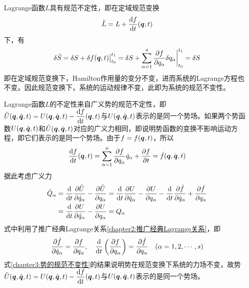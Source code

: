 Lagrange函数$L$具有规范不定性，即在{\heiti 定域规范变换}
\begin{equation}
	\tilde{L} = L + \frac{\mathrm{d} f}{\mathrm{d} t}(\boldsymbol{q},t)
\end{equation}
下，有
\begin{equation*}
	\delta \tilde{S} = \delta S + \delta f(\boldsymbol{q},t)\big|_{t_0}^{t_1} = \delta S + \sum_{\alpha=1}^s \frac{\partial f}{\partial q_\alpha} \delta q_\alpha \bigg|_{t_0}^{t_1} = \delta S
\end{equation*}
即在定域规范变换下，Hamilton作用量的变分不变，进而系统的Lagrange方程也不变。因此规范变换下，系统的运动规律不变，此即为系统的{\heiti 规范不变性}。

Lagrange函数$L$的不定性来自广义势的规范不定性，即$\tilde{U}(\boldsymbol{q},\dot{\boldsymbol{q}},t) = U(\boldsymbol{q},\dot{\boldsymbol{q}},t) - \dfrac{\mathrm{d} f}{\mathrm{d} t}(\boldsymbol{q},t)$与$U(\boldsymbol{q},\dot{\boldsymbol{q}},t)$表示的是同一个势场。如果两个势函数$U(\boldsymbol{q},\dot{\boldsymbol{q}},t)$和$\tilde{U}(\boldsymbol{q},\dot{\boldsymbol{q}},t)$对应的广义力相同，即说明势函数的变换不影响运动方程，即它们表示的是同一个势场。由于$f = f(\boldsymbol{q},t)$，所以
\begin{equation*}
	\dfrac{\mathrm{d} f}{\mathrm{d} t}(\boldsymbol{q},t) = \sum_{\alpha=1}^n \frac{\partial f}{\partial q_\alpha} \dot{q}_\alpha + \frac{\partial f}{\partial t} = \dot{f}(\boldsymbol{q},\dot{\boldsymbol{q}},t)
\end{equation*}
据此考虑广义力
\begin{align}
	\tilde{Q}_\alpha & = \frac{\mathrm{d}}{\mathrm{d} t} \frac{\partial \tilde{U}}{\partial \dot{q}_\alpha} - \frac{\partial \tilde{U}}{\partial q_\alpha} = \frac{\mathrm{d}}{\mathrm{d} t} \frac{\partial U}{\partial \dot{q}_\alpha} - \frac{\partial U}{\partial q_\alpha} - \frac{\mathrm{d}}{\mathrm{d} t} \frac{\partial \dot{f}}{\partial \dot{q}_\alpha} + \frac{\partial \dot{f}}{\partial q_\alpha} \nonumber \\
	& = \frac{\mathrm{d}}{\mathrm{d} t} \frac{\partial U}{\partial \dot{q}_\alpha} - \frac{\partial U}{\partial q_\alpha} = Q_\alpha \label{chapter3:势的规范不变性}
\end{align}
式中利用了推广经典Lagrange关系\eqref{chapter2:推广经典Lagrange关系}，即
\begin{equation*}
	\frac{\partial \dot{f}}{\partial \dot{q}_\alpha} = \frac{\partial f}{\partial q_\alpha}, \quad \frac{\mathrm{d}}{\mathrm{d} t}\left(\frac{\partial f}{\partial q_\alpha}\right) = \frac{\partial \dot{f}}{\partial q_\alpha}\quad (\alpha=1,2,\cdots,s)
\end{equation*}
式\eqref{chapter3:势的规范不变性}的结果说明势在规范变换下系统的力场不变，故势$\tilde{U}(\boldsymbol{q},\dot{\boldsymbol{q}},t) = U(\boldsymbol{q},\dot{\boldsymbol{q}},t) - \dfrac{\mathrm{d} f}{\mathrm{d} t}(\boldsymbol{q},t)$与$U(\boldsymbol{q},\dot{\boldsymbol{q}},t)$表示的是同一个势场。

